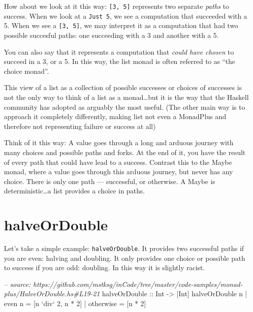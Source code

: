 \documentclass[]{article}
\newenvironment{Shaded}{}{}
\newcommand{\DataTypeTok}[1]{\textcolor[rgb]{0.56,0.13,0.00}{{#1}}}
\newcommand{\DecValTok}[1]{\textcolor[rgb]{0.25,0.63,0.44}{{#1}}}
\newcommand{\CommentTok}[1]{\textcolor[rgb]{0.38,0.63,0.69}{\textit{{#1}}}}
\newcommand{\OtherTok}[1]{\textcolor[rgb]{0.00,0.44,0.13}{{#1}}}
\newcommand{\FunctionTok}[1]{\textcolor[rgb]{0.02,0.16,0.49}{{#1}}}
\newcommand{\NormalTok}[1]{{#1}}
\begin{document}
How about we look at it this way: \texttt{{[}3,\ 5{]}} represents two
separate \emph{paths} to success. When we look at a \texttt{Just\ 5}, we
see a computation that succeeded with a 5. When we see a
\texttt{{[}3,\ 5{]}}, we may interpret it as a computation that had two
possible succesful paths: one succeeding with a 3 and another with a 5.

You can also say that it represents a computation that \emph{could have
chosen} to succeed in a 3, or a 5. In this way, the list monad is often
referred to as ``the choice monad''.

This view of a list as a collection of possible successes or choices of
successes is not the only way to think of a list as a monad\ldots{}but
it is the way that the Haskell community has adopted as arguably the
most useful. (The other main way is to approach it completely
differently, making list not even a MonadPlus and therefore not
representing failure or success at all)

Think of it this way: A value goes through a long and arduous journey
with many choices and possible paths and forks. At the end of it, you
have the result of every path that could have lead to a success.
Contrast this to the Maybe monad, where a value goes through this
arduous journey, but never has any choice. There is only one path ---
successful, or otherwise. A Maybe is deterministic\ldots{}a list
provides a choice in paths.

\section{halveOrDouble}\label{halveordouble}

Let's take a simple example: \texttt{halveOrDouble}. It provides two
successful paths if you are even: halving and doubling. It only provides
one choice or possible path to success if you are odd: doubling. In this
way it is slightly racist.

\begin{Shaded}
\begin{Highlighting}[]
\CommentTok{-- source: https://github.com/mstksg/inCode/tree/master/code-samples/monad-plus/HalveOrDouble.hs#L19-21}
\OtherTok{halveOrDouble ::} \DataTypeTok{Int} \OtherTok{->} \NormalTok{[}\DataTypeTok{Int}\NormalTok{]}
\NormalTok{halveOrDouble n }\FunctionTok{|} \NormalTok{even n    }\FunctionTok{=} \NormalTok{[n }\OtherTok{`div`} \DecValTok{2}\NormalTok{, n }\FunctionTok{*} \DecValTok{2}\NormalTok{]}
                \FunctionTok{|} \NormalTok{otherwise }\FunctionTok{=} \NormalTok{[n }\FunctionTok{*} \DecValTok{2}\NormalTok{]}
\end{Highlighting}
\end{Shaded}
\end{document}
